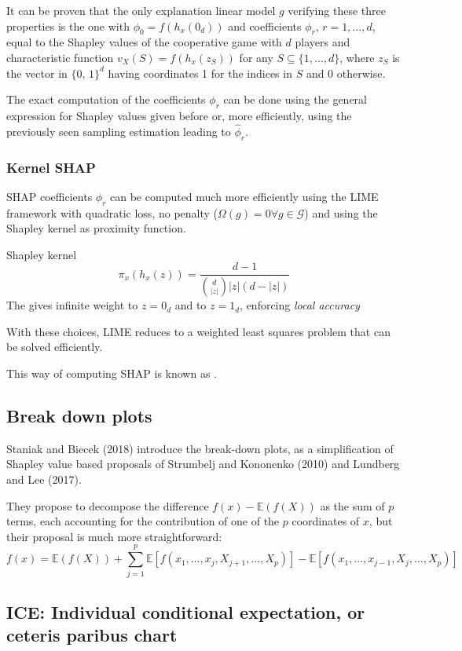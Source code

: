 It can be proven that the only explanation linear model $g$ verifying these three
properties is the one with $\phi_0 = f(h_x(0_d))$ and coefficients $\phi_r,\, r=1,\ldots,d$, equal to
the Shapley values of the cooperative game with $d$ players and characteristic function
$v_X(S) = f(h_x(z_S))$ for any $S \subseteq \{1,\ldots,d\}$,
where $z_S$ is the vector in $\{0,\,1\}^d$ having coordinates 1 for the indices in $S$ and 0 otherwise.

The exact computation of the coefficients $\phi_r$ can be done using the general expression for
Shapley values given before or, more efficiently,
using the previously seen sampling estimation leading to $\hat \phi_r$.

\subsubsection{Kernel SHAP}

SHAP coefficients $\phi_r$ can be computed much more efficiently using the LIME
framework with quadratic loss, no penalty ($\Omega(g) = 0 \forall g \in \mathcal G$) and
using the Shapley kernel as proximity function.

\begin{definition}{Shapley kernel}{}
    \begin{equation*}
        \pi_x (h_x(z)) = \frac{d - 1}{\binom{d}{|z|}|z|(d - |z|)}
    \end{equation*}
    \tcblower
    The  gives infinite weight to $z = 0_d$ and to $z = 1_d$,
    enforcing \emph{local accuracy}
\end{definition}

With these choices, LIME reduces to a weighted least squares problem that can be solved efficiently.

This way of computing SHAP is known as .


\subsection{Break down plots}

Staniak and Biecek (2018) introduce the break-down plots, as a
simplification of Shapley value based proposals of Strumbelj and
Kononenko (2010) and Lundberg and Lee (2017).

They propose to decompose the difference $f(x) − \mathds E(f (X))$ as the
sum of $p$ terms, each accounting for the contribution of one of the $p$
coordinates of $x$, but their proposal is much more straightforward:
\begin{equation*}
    f(x) = \mathds E(f(X)) + \sum_{j = 1}^p \mathds E \left[
        f(x_1,\ldots,x_j,X_{j+1},\ldots,X_p)
    \right] - \mathds E \left[
        f(x_1,\ldots,x_{j-1},X_{j},\ldots,X_p)
    \right]
\end{equation*}

\subsection{ICE: Individual conditional expectation, or ceteris paribus chart}
